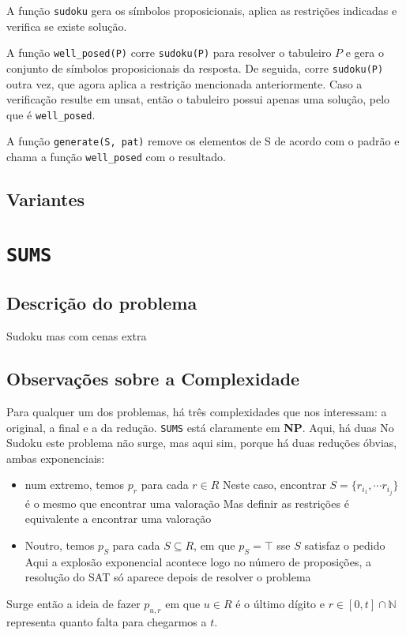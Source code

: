 \documentclass[a4paper,12pt]{article}
\newcommand{\sums}{\texttt{SUMS}\xspace}
\newcommand{\np}{\textbf{NP}\xspace}
\newcommand{\code}[1]{\texttt{#1}}
\begin{document}
A função \code{sudoku} gera os símbolos proposicionais, aplica as restrições
indicadas e verifica se existe solução.

A função \code{well\_posed(P)} corre \code{sudoku(P)} para resolver o tabuleiro
$P$ e gera o conjunto de símbolos proposicionais da resposta. De seguida, corre
\code{sudoku(P)} outra vez, que agora aplica a restrição mencionada anteriormente.
Caso a verificação resulte em unsat, então o tabuleiro possui apenas uma solução,
pelo que é \code{well\_posed}.

A função \code{generate(S, pat)} remove os elementos de S de acordo com o
padrão e chama a função \code{well\_posed} com o resultado.

\subsection{Variantes}

\section{\sums}
\subsection{Descrição do problema}
Sudoku mas com cenas extra

\subsection{Observações sobre a Complexidade}
Para qualquer um dos problemas, há três complexidades que nos interessam: a
original, a final e a da redução. 
\sums está claramente em \np.
Aqui, há duas
No Sudoku este problema não surge, mas aqui sim, porque há duas reduções
óbvias, ambas exponenciais:
\begin{itemize}
   \item num extremo, temos $p_r$ para cada $r\in R$ Neste caso, encontrar
      $S=\{r_{i_1},\cdots r_{i_j}\}$ é o mesmo que encontrar uma valoração
      Mas definir as restrições é equivalente a encontrar uma valoração

   \item Noutro, temos $p_S$ para cada $S\subseteq R$, em que $p_S=\top$ sse
      $S$ satisfaz o pedido
      Aqui a explosão exponencial acontece logo no número de proposições, a
      resolução do SAT só aparece depois de resolver o problema
\end{itemize}

Surge então a ideia de fazer $p_{u,r}$ em que $u\in R$ é o último dígito e
$r\in [0,t]\cap\mathbb N$ representa quanto falta para chegarmos a $t$.
\end{document}
